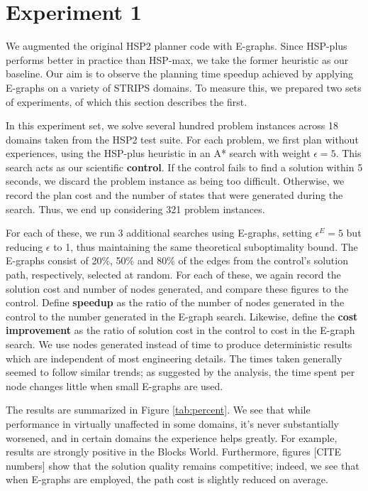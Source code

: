 \documentclass[letterpaper]{article}
\begin{document}
\section{Experiment 1}

We augmented the original HSP2 planner code \cite{bonet2001planning} with E-graphs.
Since HSP-plus performs better in practice than HSP-max, we take the former heuristic as our baseline.
Our aim is to observe the planning time speedup achieved by applying E-graphs on a variety of STRIPS domains.
To measure this, we prepared two sets of experiments, of which this section describes the first.

In this experiment set, we solve several hundred problem instances across 18 domains taken from the HSP2 test suite.
For each problem, we first plan without experiences, using the HSP-plus heuristic in an A* search with weight $\epsilon=5$.
This search acts as our scientific \textbf{control}.
If the control fails to find a solution within 5 seconds, we discard the problem instance as being too difficult.
Otherwise, we record the plan cost and the number of states that were generated during the search.
Thus, we end up considering 321 problem instances.

For each of these, we run 3 additional searches using E-graphs, setting $\epsilon^E=5$ but reducing $\epsilon$ to 1, thus maintaining the same theoretical suboptimality bound.
The E-graphs consist of 20\%, 50\% and 80\% of the edges from the control's solution path, respectively, selected at random. For each of these, we again record the solution cost and number of nodes generated, and compare these figures to the control.
Define \textbf{speedup} as the ratio of the number of nodes generated in the control to the number generated in the E-graph search.
Likewise, define the \textbf{cost improvement} as the ratio of solution cost in the control to cost in the E-graph search.
We use nodes generated instead of time to produce deterministic results which are independent of most engineering details.
The times taken generally seemed to follow similar trends; as suggested by the analysis, the time spent per node changes little when small E-graphs are used.

The results are summarized in Figure \ref{tab:percent}.
We see that while performance in virtually unaffected in some domains, it's never substantially worsened, and in certain domains the experience helps greatly.
For example, results are strongly positive in the Blocks World.
Furthermore, figures [CITE numbers] show that the solution quality remains competitive; indeed, we see that when E-graphs are employed, the path cost is slightly reduced on average.
\end{document}
